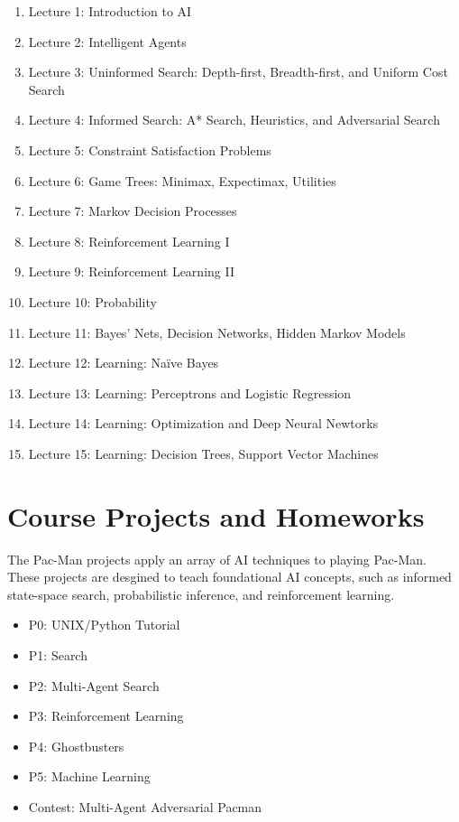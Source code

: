 \documentclass[11pt]{article}
\begin{document}
\begin{enumerate}
  \item Lecture 1: Introduction to AI
  \item Lecture 2: Intelligent Agents
  \item Lecture 3: Uninformed Search: Depth-first, Breadth-first, and Uniform Cost Search
  \item Lecture 4: Informed Search: A* Search, Heuristics, and Adversarial Search
  \item Lecture 5: Constraint Satisfaction Problems
  \item Lecture 6: Game Trees: Minimax, Expectimax, Utilities
  \item Lecture 7: Markov Decision Processes
  \item Lecture 8: Reinforcement Learning I
  \item Lecture 9: Reinforcement Learning II
  \item Lecture 10: Probability
  \item Lecture 11: Bayes' Nets, Decision Networks, Hidden Markov Models
  \item Lecture 12: Learning: Naïve Bayes
  \item Lecture 13: Learning: Perceptrons and Logistic Regression
  \item Lecture 14: Learning: Optimization and Deep Neural Newtorks
  \item Lecture 15: Learning: Decision Trees, Support Vector Machines
\end{enumerate}


\section*{Course Projects and Homeworks}

The Pac-Man projects apply an array of AI techniques to playing Pac-Man. These projects are desgined to teach foundational AI concepts, such as informed state-space search, probabilistic inference, and reinforcement learning.

\begin{itemize}
\item P0: UNIX/Python Tutorial
\item P1: Search
\item P2: Multi-Agent Search
\item P3: Reinforcement Learning
\item P4: Ghostbusters
\item P5: Machine Learning
\item Contest: Multi-Agent Adversarial Pacman
\end{itemize}
\end{document}
